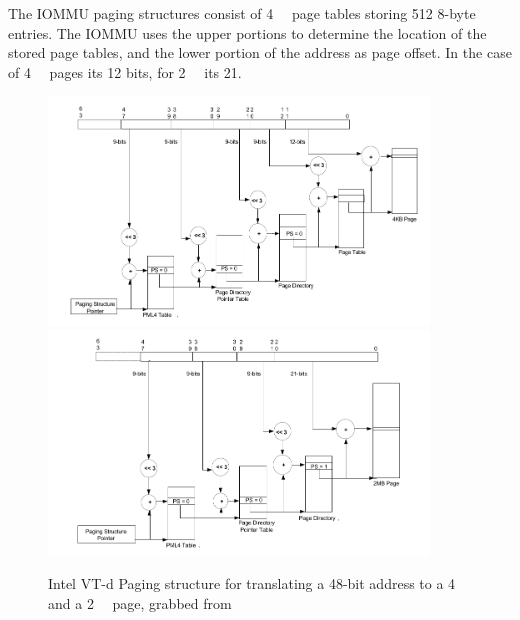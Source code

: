 The IOMMU paging structures consist of \qty{4}{\kibi\byte} page tables storing 512 8-byte entries. The IOMMU uses the upper portions to determine the location of the stored page tables, and the lower portion of the address as page offset. In the case of \qty{4}{\kibi\byte} pages its 12 bits, for \qty{2}{\mebi\byte} its 21.


\begin{figure}
    \centering
     {\includegraphics[width=0.9\textwidth]{figures/4kibtranslation.pdf}\label{fig:pagewalk4kib}}
     {\includegraphics[width=0.9\textwidth]{figures/2mibtranslation.pdf}\label{fig:pagewalk2mib}}
    \caption{Intel VT-d Paging structure for translating a 48-bit address to a \qty{4}{\kibi\byte} and a \qty{2}{\mebi\byte} page, grabbed from \cite{vtdspec}}
    \label{fig:pagewalk}
\end{figure}


